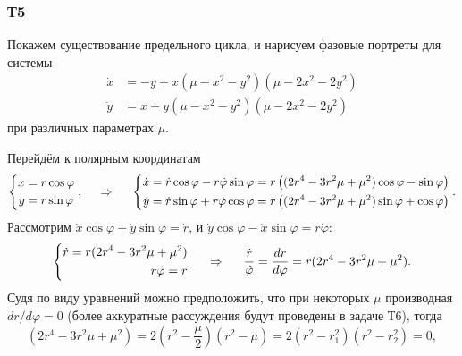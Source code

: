 \subsubsection*{Т5}
Покажем существование предельного цикла, и нарисуем фазовые портреты для системы 
\begin{align*}
    \dot{x} &= - y + x (\mu - x^2 - y^2)(\mu - 2 x^2 - 2 y^2) \\
    \dot{y} &= x + y (\mu - x^2 - y^2)(\mu - 2 x^2 - 2 y^2)
\end{align*}
 при различных параметрах $\mu$.

Перейдём к полярным координатам
\begin{equation*}
    \left\{\begin{aligned}
        x &= r \cos \varphi \\
        y &= r \sin \varphi
    \end{aligned}\right. ,
    \hspace{0.5cm} \Rightarrow \hspace{0.5cm}
    \left\{\begin{aligned}
        \dot{x} &= \dot{r} \cos \varphi - r \dot{\varphi} \sin \varphi 
        = r \left(
            (2 r^4 - 3 r^2 \mu  +\mu^2) \cos \varphi - \sin \varphi
        \right)
        \\
        \dot{y} &= \dot{r} \sin \varphi + r \dot{\varphi} \cos \varphi 
        = r \left(
            (2 r^4 - 3 r^2 \mu  +\mu^2) \sin \varphi + \cos \varphi
        \right)
    \end{aligned}\right. .
\end{equation*}
Рассмотрим $\dot{x} \cos \varphi + \dot{y} \sin \varphi = \dot{r}$, и $\dot{y} \cos \varphi - \dot{x} \sin \varphi = r \dot{\varphi}$:
\begin{equation*}
    \left\{\begin{aligned}
        \dot{r} = r (2 r^4 - 3 r^2 \mu + \mu^2) \\
        r \dot{\varphi} = r
    \end{aligned}\right.
    \hspace{0.5cm} \Rightarrow \hspace{0.5cm}
    \frac{\dot{r}}{\dot{\varphi}} = \frac{d r}{d \varphi} = r (2 r^4 - 3 r^2 \mu + \mu^2).
\end{equation*}
Судя по виду уравнений можно предположить, что при некоторых $\mu$ производная $dr / d\varphi = 0$ (более аккуратные рассуждения будут проведены в задаче Т6), тогда
\begin{equation*}
    (2 r^4 - 3 r^2 \mu + \mu^2) = 
    2 \left(r^2 - \frac{\mu}{2}\right) \left(r^2 - \mu\right) = 
    2 \left(r^2 - r_1^2\right) \left(r^2 - r_2^2\right)
    = 0,
\end{equation*}
